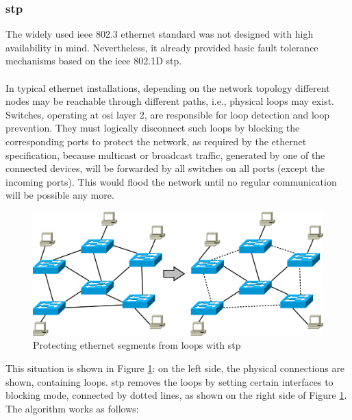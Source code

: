 \subsubsection{\gls{stp}}
The widely used \gls{ieee} 802.3 ethernet standard was not designed with high availability in mind.
Nevertheless, it already provided basic fault tolerance mechanisms based on the \gls{ieee} 802.1D \gls{stp}. 
\\
\\
In typical ethernet installations, depending on the network topology different
nodes may be reachable through different paths, i.e., physical loops may exist.
Switches, operating at \gls{osi} layer 2, are responsible for loop detection and
loop prevention. They must logically disconnect such loops by blocking the corresponding ports to protect the network,
as required by the ethernet specification, because multicast or broadcast traffic, generated by one of the connected
devices, will be forwarded by all switches on all ports (except the incoming ports). This would flood the network until no regular communication will be possible any
more.
\\
\begin{figure}[H]
 \includegraphics[width=\linewidth]{figures/stp.eps}
 \caption{Protecting ethernet segments from loops with \gls{stp}}
\label{fig:stp1}
\end{figure}
This situation is shown in Figure \ref{fig:stp1}: on the left side, the physical connections are shown, containing loops. 
\gls{stp} removes
the loops by setting certain interfaces to blocking mode, connected by dotted lines, as shown on the right side of Figure \ref{fig:stp1}.
\\
The algorithm works as follows:

